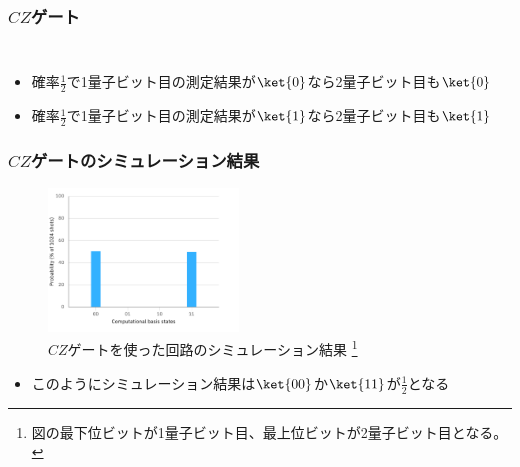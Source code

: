 \begin{frame}
  \frametitle{$CZ$ゲート}

  \begin{columns}
    \begin{column}{0.5\textwidth}
      \begin{figure}
      \end{figure}
    \end{column}
    \begin{column}{0.5\textwidth}
    \end{column}
  \end{columns}

  \pause
  \begin{itemize}
    \item 確率$\frac{1}{2}$で1量子ビット目の測定結果が$\ket{0}$なら2量子ビット目も$\ket{0}$
    \item 確率$\frac{1}{2}$で1量子ビット目の測定結果が$\ket{1}$なら2量子ビット目も$\ket{1}$
  \end{itemize}

  \pause
\end{frame}

\begin{frame}
  \frametitle{$CZ$ゲートのシミュレーション結果}

  \begin{center}
    \begin{figure}
      \includegraphics[width=0.45\textwidth]{./img/cz_gate_histogram.pdf}
      \caption{%
        $CZ$ゲートを使った回路のシミュレーション結果%
        \footnote{図の最下位ビットが1量子ビット目、最上位ビットが2量子ビット目となる。}%
      }
    \end{figure}
  \end{center}

  \pause
  \begin{itemize}
    \item このようにシミュレーション結果は$\ket{00}$か$\ket{11}$が$\frac{1}{2}$となる
  \end{itemize}
\end{frame}

